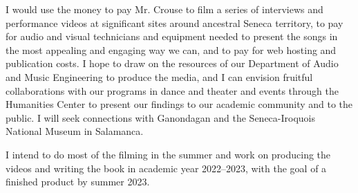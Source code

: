 \documentclass[12pt]{article}
\begin{document}
I would use the money to pay Mr. Crouse to film a series of interviews and
performance videos at significant sites around ancestral Seneca territory, to
pay for audio and visual technicians and equipment needed to present the songs
in the most appealing and engaging way we can, and to pay for web hosting
and publication costs. 
I hope to draw on the resources of our Department of Audio and Music
Engineering to produce the media, and I can envision fruitful collaborations
with our programs in dance and theater and events through the Humanities
Center to present our findings to our academic community and to the public.
I will seek connections with Ganondagan and the Seneca-Iroquois National
Museum in Salamanca.

I intend to do most of the filming in the summer and work on producing the
videos and writing the book in academic year 2022--2023, with the goal of a
finished product by summer 2023.
\end{document}
